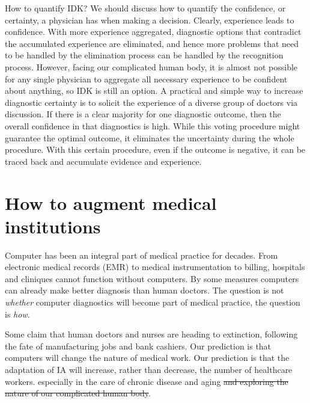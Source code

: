 \documentclass[11pt]{pnas-new}
\begin{document}
How to quantify IDK? We should discuss how to quantify the confidence, or certainty, a physician has when making a decision. 
\fi
Clearly, experience leads to confidence. With more experience aggregated, diagnostic options that contradict the accumulated
  experience are eliminated, and hence more problems that need to be handled by the elimination process can be handled by the recognition process. However, facing our complicated human body, it is almost not possible for any single physician to aggregate all necessary experience to be confident about anything, so IDK is still an option. A practical and simple way to increase diagnostic certainty is to solicit the experience of a diverse group of doctors via discussion. If there is a clear majority for one diagnostic outcome,
      then the overall confidence in that diagnostics is high. While this voting procedure might guarantee the optimal outcome, it eliminates the uncertainty during the whole procedure. With this certain procedure, even if the outcome is negative, it can be traced back and accumulate evidence and experience. 

\section{How to augment medical institutions}

  Computer {\color{blue}has been} an integral part of medical practice {\color{blue}for decades}. From
  {\color{blue}electronic} medical records (EMR) to medical instrumentation to billing,
  hospitals and cliniques cannot function without computers. By some
  measures computers can already make better diagnosis than human
  doctors. The question is not {\em whether} computer diagnostics will
  become part of medical practice, the question is {\em how}.

  Some claim that human doctors and nurses are heading to extinction,
  following the fate of manufacturing jobs and bank cashiers.  Our
  prediction is that computers will change the nature of medical
  work. Our prediction is that the adaptation of IA will increase,
  rather than decrease, the number of healthcare workers. especially
  in the care of chronic disease and aging \st{and exploring the
    nature of our complicated human body}.
\end{document}
